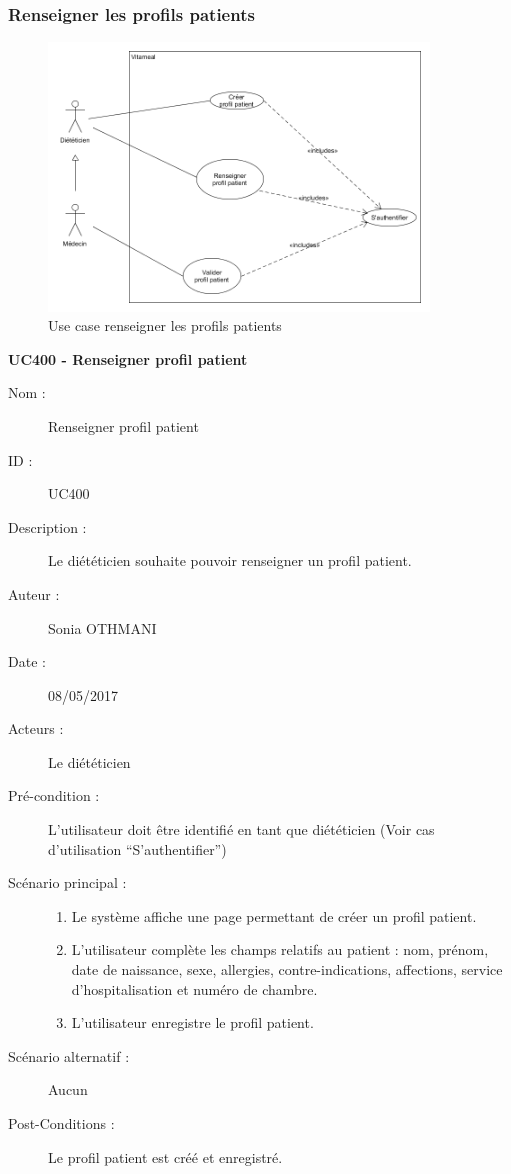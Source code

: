 \subsubsection{Renseigner les profils patients}

\begin{figure}[!h]
  \label{diagramme-renseigner-les-profils-patients}
  \centering
  \includegraphics[width=0.9\textwidth]{../../CasDUtilisations/ProfilPatient/UseCaseProfilPatient.png}
  \caption{Use case renseigner les profils patients}
\end{figure}

\textbf{UC400 - Renseigner profil patient}
\begin{description}
\item [Nom :] Renseigner profil patient
\item [ID :] UC400
\item [Description :] Le diététicien souhaite pouvoir renseigner un profil patient.
\item [Auteur :] Sonia OTHMANI
\item [Date :] 08/05/2017
\item [Acteurs :] Le diététicien
\item [Pré-condition :] L’utilisateur doit être identifié en tant que diététicien (Voir cas d’utilisation \enquote{S’authentifier})
\item [Scénario principal :]
  \begin{enumerate}
  \item Le système affiche une page permettant de créer un profil patient.
  \item L’utilisateur complète les champs relatifs au patient : nom, prénom, date de naissance, sexe, allergies, contre-indications, affections, service d'hospitalisation et numéro de chambre.
  \item L’utilisateur enregistre le profil patient.
 
  \end{enumerate}
\item [Scénario alternatif :] Aucun
\item [Post-Conditions :] Le profil patient est créé et enregistré.
\end{description}

